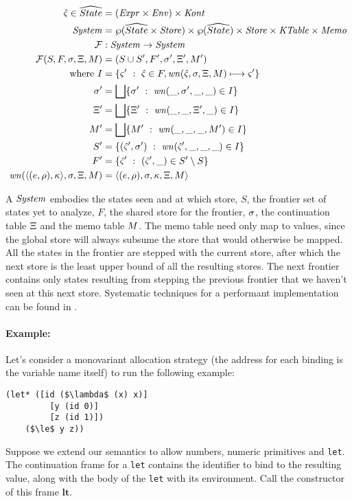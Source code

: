 \begin{align*}
  \hat\varsigma \in \widehat{State} &= (\mathit{Expr} \times \mathit{Env}) \times \mathit{Kont} \\
  \mathit{System} &= \wp(\widehat{State} \times \mathit{Store}) \times \wp(\widehat{State}) \times \mathit{Store} \times \mathit{KTable} \times \mathit{Memo} \\
  {\mathcal F} &: \mathit{System} \to \mathit{System} \\
  {\mathcal F}(S, F, \sigma, \Xi, M) &= (S \cup S', F', \sigma', \Xi', M') \\
  \text{where } I &= \{ \varsigma'\ :\ \hat\varsigma \in F, \mathit{wn}(\hat\varsigma,\sigma,\Xi,M) \longmapsto \varsigma'\} \\
                \sigma' &= \bigsqcup\{ \sigma'\ :\ \mathit{wn}(\_, \sigma',\_,\_) \in I\} \\
                \Xi' &=  \bigsqcup\{ \Xi'\ :\ \mathit{wn}(\_, \_, \Xi', \_) \in I\} \\
                M' &=  \bigsqcup\{ M'\ :\ \mathit{wn}(\_, \_, \_, M') \in I\} \\
                S' &= \{ (\hat\varsigma',\sigma')\ :\ \mathit{wn}(\hat\varsigma', \_, \_, \_) \in I\} \\
                F' &= \{ \hat\varsigma'\ :\ (\hat\varsigma',\_) \in S' \setminus S\} \\
                \mathit{wn}(\langle (e,\rho),\kappa \rangle,\sigma,\Xi,M)
                   &= \langle (e,\rho),\sigma,\kappa,\Xi,M \rangle
\end{align*}

A $\mathit{System}$ embodies the states seen and at which store, $S$, the frontier set of states yet to analyze, $F$, the shared store for the frontier, $\sigma$, the continuation table $\Xi$ and the memo table $M$.
%
The memo table need only map to values, since the global store will always subsume the store that would otherwise be mapped.
%
All the states in the frontier are stepped with the current store, after which the next store is the least upper bound of all the resulting stores.
%
The next frontier contains only states resulting from stepping the previous frontier that we haven't seen at this next store.
%
Systematic techniques for a performant implementation can be found in \citet{ianjohnson:oaam:icfp2013}.

\paragraph{Example:} Let's consider a monovariant allocation strategy (the address for each binding is the variable name itself) to run the following example:
\begin{lstlisting}[mathescape]
  (let* ([id ($\lambda$ (x) x)]
         [y (id 0)]
         [z (id 1)])
    ($\le$ y z))
\end{lstlisting}
Suppose we extend our semantics to allow numbers, numeric primitives and \texttt{let}.
%
The continuation frame for a \texttt{let} contains the identifier to bind to the resulting value, along with the body of the \texttt{let} with its environment.
%
Call the constructor of this frame $\mathbf{lt}$.

